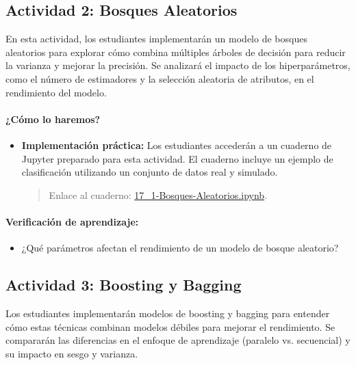 \documentclass[a4,11pt]{aleph-notas}
\begin{document}
\subsection*{Actividad 2: Bosques Aleatorios}

En esta actividad, los estudiantes implementarán un modelo de bosques aleatorios para explorar cómo combina múltiples árboles de decisión para reducir la varianza y mejorar la precisión. Se analizará el impacto de los hiperparámetros, como el número de estimadores y la selección aleatoria de atributos, en el rendimiento del modelo.

\paragraph{¿Cómo lo haremos?}  
\begin{itemize}[leftmargin=*]
    \item \textbf{Implementación práctica:}  
    Los estudiantes accederán a un cuaderno de Jupyter preparado para esta actividad. El cuaderno incluye un ejemplo de clasificación utilizando un conjunto de datos real y simulado.  
    \begin{quote}
        Enlace al cuaderno: \href{https://colab.research.google.com/github/andres-merino/AprendizajeAutomaticoInicial-05-N0105/blob/main/2-Notebooks/17_1-Bosques-Aleatorios.ipynb}{17\_1-Bosques-Aleatorios.ipynb}.
    \end{quote}
\end{itemize}

\paragraph{Verificación de aprendizaje:}  
\begin{itemize}[leftmargin=*]
    \item ¿Qué parámetros afectan el rendimiento de un modelo de bosque aleatorio?   
\end{itemize}  

\subsection*{Actividad 3: Boosting y Bagging}

Los estudiantes implementarán modelos de boosting y bagging para entender cómo estas técnicas combinan modelos débiles para mejorar el rendimiento. Se compararán las diferencias en el enfoque de aprendizaje (paralelo vs. secuencial) y su impacto en sesgo y varianza.
\end{document}
